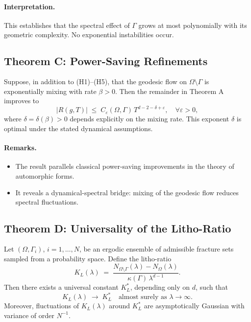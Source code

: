 \paragraph{Interpretation.}
This establishes that the spectral effect of $\Gamma$ grows at most
polynomially with its geometric complexity. No exponential instabilities occur.

\subsection{Theorem C: Power-Saving Refinements}

\begin{theoremC}
Suppose, in addition to (H1)--(H5), that the geodesic flow on
$\Omega\setminus\Gamma$ is exponentially mixing with rate $\beta>0$. Then the
remainder in Theorem A improves to
\[
|R(g,T)| \;\leq\; C_\varepsilon(\Omega,\Gamma)\,
T^{d-2-\delta+\varepsilon}, \quad \forall \varepsilon>0,
\]
where $\delta=\delta(\beta)>0$ depends explicitly on the mixing rate. This
exponent $\delta$ is optimal under the stated dynamical assumptions.
\end{theoremC}

\paragraph{Remarks.}
\begin{itemize}
  \item The result parallels classical power-saving improvements in the theory
  of automorphic forms.
  \item It reveals a dynamical-spectral bridge: mixing of the geodesic flow
  reduces spectral fluctuations.
\end{itemize}

\subsection{Theorem D: Universality of the Litho-Ratio}

\begin{theoremD}[Universality of $K_L$]
Let $(\Omega,\Gamma_i)$, $i=1,\dots,N$, be an ergodic ensemble of admissible
fracture sets sampled from a probability space. Define the litho-ratio
\[
K_L(\lambda) \;=\;
\frac{N_{\Omega\setminus\Gamma}(\lambda)-N_\Omega(\lambda)}
{\kappa(\Gamma)\,\lambda^{d-1}}.
\]
Then there exists a universal constant $K_L^\ast$, depending only on $d$, such
that
\[
K_L(\lambda) \;\to\; K_L^\ast \quad \text{almost surely as }
\lambda\to\infty.
\]
Moreover, fluctuations of $K_L(\lambda)$ around $K_L^\ast$ are asymptotically
Gaussian with variance of order $N^{-1}$.
\end{theoremD}

